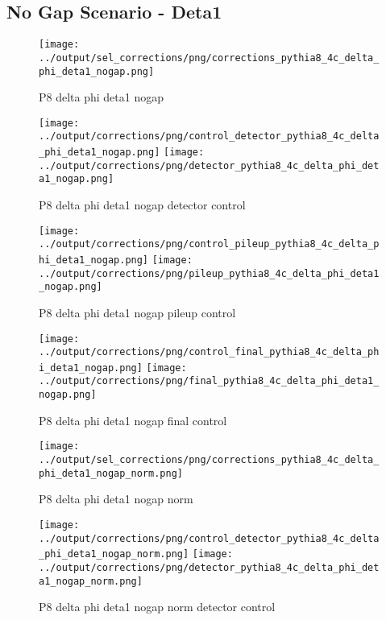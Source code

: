 \documentclass[11pt]{book}
\begin{document}
\clearpage
\subsection{No Gap Scenario - Deta1}
\begin{figure}[ht]
\centering
\texttt{[image: ../output/sel\_corrections/png/corrections\_pythia8\_4c\_delta\_phi\_deta1\_nogap.png]}
\caption{P8 delta phi deta1 nogap}
\label{fig:p8_delta_phi_deta1_nogap}
\end{figure}


\begin{figure}[ht]
\centering
\texttt{[image: ../output/corrections/png/control\_detector\_pythia8\_4c\_delta\_phi\_deta1\_nogap.png]}
\texttt{[image: ../output/corrections/png/detector\_pythia8\_4c\_delta\_phi\_deta1\_nogap.png]}
\caption{P8 delta phi deta1 nogap detector control}
\label{fig:p8_delta_phi_deta1_nogap_detector_control}
\end{figure}

\begin{figure}[ht]
\centering
\texttt{[image: ../output/corrections/png/control\_pileup\_pythia8\_4c\_delta\_phi\_deta1\_nogap.png]}
\texttt{[image: ../output/corrections/png/pileup\_pythia8\_4c\_delta\_phi\_deta1\_nogap.png]}
\caption{P8 delta phi deta1 nogap pileup control}
\label{fig:p8_delta_phi_deta1_nogap_pileup_control}
\end{figure}


\begin{figure}[ht]
\centering
\texttt{[image: ../output/corrections/png/control\_final\_pythia8\_4c\_delta\_phi\_deta1\_nogap.png]}
\texttt{[image: ../output/corrections/png/final\_pythia8\_4c\_delta\_phi\_deta1\_nogap.png]}
\caption{P8 delta phi deta1 nogap final control}
\label{fig:p8_delta_phi_deta1_nogap_final_control}
\end{figure}


\begin{figure}[ht]
\centering
\texttt{[image: ../output/sel\_corrections/png/corrections\_pythia8\_4c\_delta\_phi\_deta1\_nogap\_norm.png]}
\caption{P8 delta phi deta1 nogap norm}
\label{fig:p8_delta_phi_deta1_nogap_norm}
\end{figure}


\begin{figure}[ht]
\centering
\texttt{[image: ../output/corrections/png/control\_detector\_pythia8\_4c\_delta\_phi\_deta1\_nogap\_norm.png]}
\texttt{[image: ../output/corrections/png/detector\_pythia8\_4c\_delta\_phi\_deta1\_nogap\_norm.png]}
\caption{P8 delta phi deta1 nogap norm detector control}
\label{fig:p8_delta_phi_deta1_nogap_norm_detector_control}
\end{figure}
\end{document}
